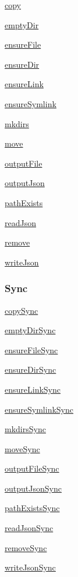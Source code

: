 \begin{DoxyItemize}
\item \mbox{\hyperlink{copy_8md}{copy}}
\item \mbox{\hyperlink{empty_dir_8md}{empty\+Dir}}
\item \mbox{\hyperlink{ensure_file_8md}{ensure\+File}}
\item \mbox{\hyperlink{ensure_dir_8md}{ensure\+Dir}}
\item \mbox{\hyperlink{ensure_link_8md}{ensure\+Link}}
\item \mbox{\hyperlink{ensure_symlink_8md}{ensure\+Symlink}}
\item \mbox{\hyperlink{ensure_dir_8md}{mkdirs}}
\item \mbox{\hyperlink{move_8md}{move}}
\item \mbox{\hyperlink{output_file_8md}{output\+File}}
\item \mbox{\hyperlink{output_json_8md}{output\+Json}}
\item \mbox{\hyperlink{path_exists_8md}{path\+Exists}}
\item \mbox{\hyperlink{read_json_8md}{read\+Json}}
\item \mbox{\hyperlink{remove_8md}{remove}}
\item \mbox{\hyperlink{write_json_8md}{write\+Json}}
\end{DoxyItemize}

\subsubsection*{Sync}


\begin{DoxyItemize}
\item \mbox{\hyperlink{copy-sync_8md}{copy\+Sync}}
\item \mbox{\hyperlink{empty_dir-sync_8md}{empty\+Dir\+Sync}}
\item \mbox{\hyperlink{ensure_file-sync_8md}{ensure\+File\+Sync}}
\item \mbox{\hyperlink{ensure_dir-sync_8md}{ensure\+Dir\+Sync}}
\item \mbox{\hyperlink{ensure_link-sync_8md}{ensure\+Link\+Sync}}
\item \mbox{\hyperlink{ensure_symlink-sync_8md}{ensure\+Symlink\+Sync}}
\item \mbox{\hyperlink{ensure_dir-sync_8md}{mkdirs\+Sync}}
\item \mbox{\hyperlink{move-sync_8md}{move\+Sync}}
\item \mbox{\hyperlink{output_file-sync_8md}{output\+File\+Sync}}
\item \mbox{\hyperlink{output_json-sync_8md}{output\+Json\+Sync}}
\item \mbox{\hyperlink{path_exists-sync_8md}{path\+Exists\+Sync}}
\item \mbox{\hyperlink{read_json-sync_8md}{read\+Json\+Sync}}
\item \mbox{\hyperlink{remove-sync_8md}{remove\+Sync}}
\item \mbox{\hyperlink{write_json-sync_8md}{write\+Json\+Sync}}
\end{DoxyItemize}

